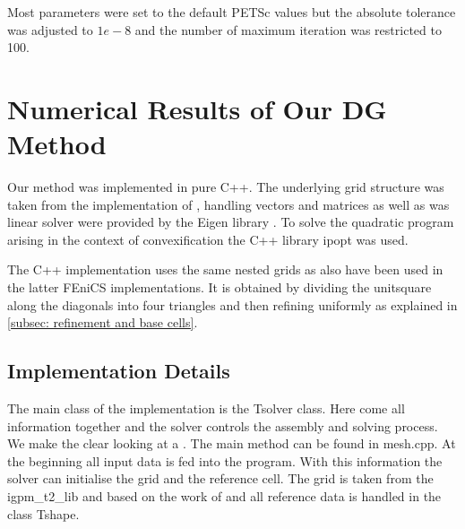 Most parameters were set to the default PETSc values %
but the absolute tolerance was adjusted to $1e-8$ and the number of maximum iteration was restricted to 100. 










\newpage

\section{Numerical Results of Our DG Method}

Our method was implemented in pure C++. The underlying grid structure was taken from the implementation of \cite{BMV2009}, handling vectors and matrices as well as was linear solver were provided by the Eigen library \cite{eigenweb}. To solve the quadratic program arising in the context of convexification the C++ library ipopt \cite{ipopt} was used.

The C++ implementation uses the same nested grids as also have been used in the latter FEniCS implementations. It is obtained by dividing the unitsquare along the diagonals into four triangles and then refining uniformly as explained in \ref{subsec: refinement and base cells}.

\subsection{Implementation Details}

The main class of the implementation is the Tsolver class. Here come all information together and the solver controls the assembly and solving process. 
We make the clear looking at a . The main method can be found in mesh.cpp. At the beginning all input data is fed into the program. With this information the solver can initialise the grid and the reference cell. 
The grid is taken from the igpm\_t2\_lib and based on the work of \cite{BMV2009} and all reference data is handled in the class Tshape.

